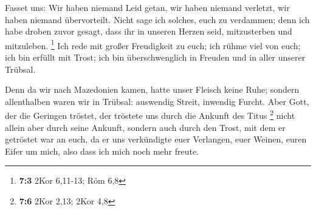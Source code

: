  Fasset uns: Wir haben niemand Leid getan, wir haben niemand
verletzt, wir haben niemand übervorteilt.  Nicht sage ich
solches, euch zu verdammen; denn ich habe droben zuvor gesagt, dass ihr
in unseren Herzen seid, mitzusterben und mitzuleben. \footnote{\textbf{7:3}
  2Kor 6,11-13; Röm 6,8}  Ich rede mit großer Freudigkeit zu
euch; ich rühme viel von euch; ich bin erfüllt mit Trost; ich bin
überschwenglich in Freuden und in aller unserer Trübsal.

 Denn da wir nach Mazedonien kamen, hatte unser Fleisch
keine Ruhe; sondern allenthalben waren wir in Trübsal: auswendig Streit,
inwendig Furcht.  Aber Gott, der die Geringen tröstet, der
tröstete uns durch die Ankunft des Titus \footnote{\textbf{7:6} 2Kor
  2,13; 2Kor 4,8}  nicht allein aber durch seine Ankunft,
sondern auch durch den Trost, mit dem er getröstet war an euch, da er
uns verkündigte euer Verlangen, euer Weinen, euren Eifer um mich, also
dass ich mich noch mehr freute.


